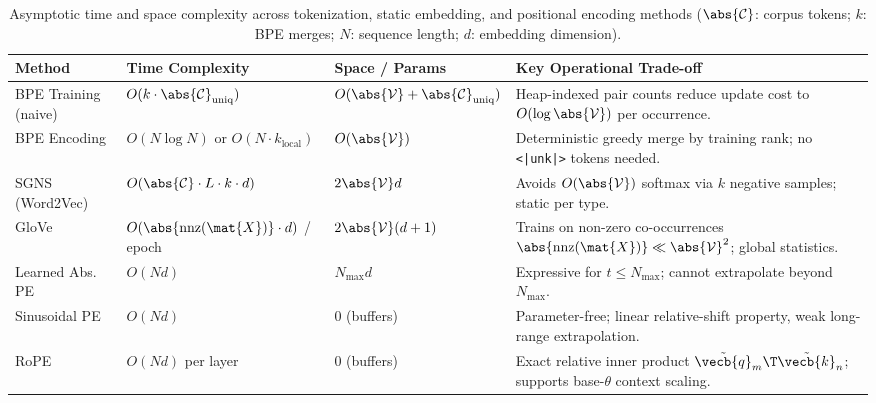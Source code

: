 \documentclass[../../../../master.tex]{subfiles}
\begin{document}
\begin{table}[htbp]
  \centering
  \caption{Asymptotic time and space complexity across tokenization, static embedding, and positional encoding methods ($\abs{\mathcal{C}}$: corpus tokens; $k$: BPE merges; $N$: sequence length; $d$: embedding dimension).}
  \label{tab:tok:complexity}
  \begin{tabularx}{\linewidth}{@{}l l l X@{}}
    \toprule
    \textbf{Method} & \textbf{Time Complexity} & \textbf{Space / Params} & \textbf{Key Operational Trade-off} \\
    \midrule
    BPE Training (naive) & $O(k \cdot \abs{\mathcal{C}}_{\mathrm{uniq}})$ & $O(\abs{\mathcal{V}} + \abs{\mathcal{C}}_{\mathrm{uniq}})$ & Heap-indexed pair counts reduce update cost to $O(\log \abs{\mathcal{V}})$ per occurrence. \\
    BPE Encoding & $O(N \log N)$ or $O(N \cdot k_{\mathrm{local}})$ & $O(\abs{\mathcal{V}})$ & Deterministic greedy merge by training rank; no \texttt{<|unk|>} tokens needed. \\
    SGNS (Word2Vec) & $O(\abs{\mathcal{C}} \cdot L \cdot k \cdot d)$ & $2\abs{\mathcal{V}} d$ & Avoids $O(\abs{\mathcal{V}})$ softmax via $k$ negative samples; static per type. \\
    GloVe & $O(\abs{\mathrm{nnz}(\mat{X})} \cdot d)$ / epoch & $2\abs{\mathcal{V}}(d+1)$ & Trains on non-zero co-occurrences $\abs{\mathrm{nnz}(\mat{X})} \ll \abs{\mathcal{V}}^2$; global statistics. \\
    Learned Abs. PE & $O(N d)$ & $N_{\max} d$ & Expressive for $t \le N_{\max}$; cannot extrapolate beyond $N_{\max}$. \\
    Sinusoidal PE & $O(N d)$ & $0$ (buffers) & Parameter-free; linear relative-shift property, weak long-range extrapolation. \\
    RoPE & $O(N d)$ per layer & $0$ (buffers) & Exact relative inner product $\tilde{\vecb{q}}_m\T \tilde{\vecb{k}}_n$; supports base-$\theta$ context scaling. \\
    \bottomrule
  \end{tabularx}
\end{table}
\end{document}
